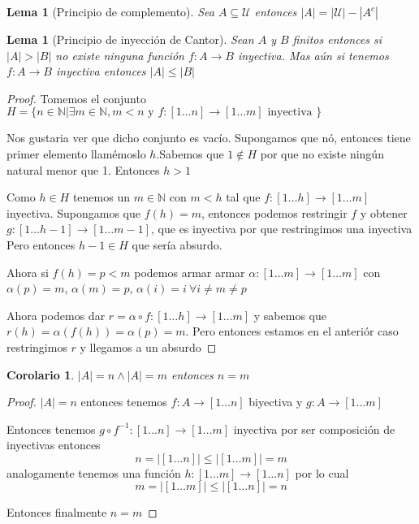 \documentclass{article}
\theoremstyle{break}
\newtheorem{corollary}{Corolario}[theorem]
\newtheorem{lemma}[theorem]{Lema}
\def \N{\mathbb{N}}
\begin{document}
    \begin{lemma}[Principio de complemento]
        Sea $A \subseteq \mathcal{U}$ entonces $|A| = |\mathcal{U}| - |A^c|$
    \end{lemma}

    \begin{lemma}[Principio de inyección de Cantor]
        Sean $A$ y $B$ finitos entonces si $|A| > |B|$ no existe ninguna función $f:A \rightarrow B$ 
        inyectiva. Mas aún si tenemos $f: A\rightarrow B$ inyectiva entonces $|A| \leq |B|$
    \end{lemma}

    \begin{proof}
        Tomemos el conjunto $H = \{n\in\N | \exists m \in \N , m<n \text{ y } f:[1\ldots n] \rightarrow [1\ldots m] \text { inyectiva }\}$

        Nos gustaria ver que dicho conjunto es vacío. Supongamos que nó, entonces tiene primer elemento 
        llamémoslo $h$.Sabemos que $1 \notin H$ por que no existe ningún natural menor que 1. Entonces 
        $h > 1$

        Como $h \in H$ tenemos un $m \in\N$ con $m < h$ tal que $f:[1\ldots h] \rightarrow [1\ldots m]$
        inyectiva. Supongamos que $f(h) = m $, entonces podemos restringir $f$ 
        y obtener $g:[1\ldots h-1] \rightarrow [1\ldots m-1]$, que es inyectiva por que restringimos una inyectiva
        Pero entonces $h-1 \in H$ que sería absurdo.

        Ahora si $f(h) = p < m$ podemos armar armar $\alpha:[1\ldots m] \rightarrow [1\ldots m]$ con 
        $\alpha(p) = m$, $\alpha (m) = p$, $\alpha (i) = i \ \forall i\neq m \neq p$

        Ahora podemos dar $r = \alpha \circ f : [1\ldots h] \rightarrow [1\ldots m]$ 
        y sabemos que $r(h) = \alpha(f(h)) = \alpha(p) = m$. Pero entonces estamos en el anteriór caso
        restringimos $r$ y llegamos a un absurdo
    \end{proof}

    \begin{corollary}
        $|A| = n \land |A| = m$ entonces $n=m$
    \end{corollary}
    \begin{proof}
        $|A|=n$ entonces tenemos $f:A\rightarrow [1\ldots n]$ biyectiva y $g:A\rightarrow [1\ldots m]$

        Entonces tenemos $g \circ f^{-1} :[1\ldots n] \rightarrow [1\ldots m] $ inyectiva por ser composición
        de inyectivas entonces $$n = |[1\ldots n]| \leq |[1\ldots m]| = m$$ analogamente tenemos una función 
        $h:[1\ldots m] \rightarrow [1\ldots n]$ por lo cual $$m = |[1\ldots m]| \leq |[1\ldots n]| = n $$

        Entonces finalmente $n = m $
    \end{proof}
\end{document}
